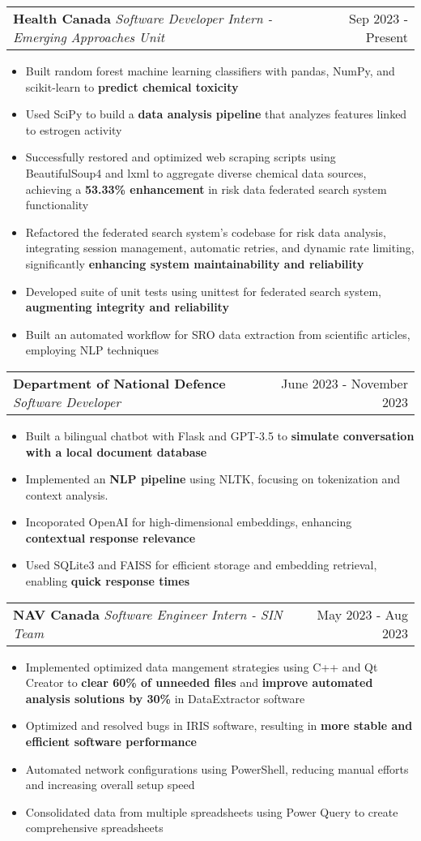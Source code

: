 \documentclass[letterpaper,11pt]{article}
\makeatletter
\newcommand{\resumeItem}[1]{
  \item\small{
    {#1 \vspace{-2pt}}
  }
}
\newcommand{\resumeSubheading}[3]{
    \item
    \begin{tabular*}{0.97\textwidth}[t]{l@{\extracolsep{\fill}}r}
      \textbf{#1} \textbar \textit{ #2} & #3 \\
    \end{tabular*}\vspace{-4.5pt}
}
\newcommand{\resumeItemListStart}{\begin{itemize}}
\newcommand{\resumeItemListEnd}{\end{itemize}\vspace{-5pt}}
\makeatother
\begin{document}
    \resumeSubheading
      {Health Canada}{Software Developer Intern - Emerging Approaches Unit}{Sep 2023 - Present}
      \resumeItemListStart
        \resumeItem{Built random forest machine learning classifiers with pandas, NumPy, and scikit-learn to \textbf{predict chemical toxicity}}
        \resumeItem{Used SciPy to build a \textbf{data analysis pipeline} that analyzes features linked to estrogen activity}
        \resumeItem{Successfully restored and optimized web scraping scripts using BeautifulSoup4 and lxml to aggregate diverse chemical data sources, achieving a \textbf{53.33\% enhancement} in risk data federated search system functionality}
        \resumeItem{Refactored the federated search system's codebase for risk data analysis, integrating session management, automatic retries, and dynamic rate limiting, significantly \textbf{enhancing system maintainability and reliability}}
        \resumeItem{Developed suite of unit tests using unittest for federated search system, \textbf{augmenting integrity and reliability}}
        \resumeItem{Built an automated workflow for SRO data extraction from scientific articles, employing NLP techniques}
      \resumeItemListEnd

    \resumeSubheading
    {Department of National Defence}{Software Developer}{June 2023 - November 2023}
      \resumeItemListStart
        \resumeItem{Built a bilingual chatbot with Flask and GPT-3.5 to \textbf{simulate conversation with a local document database}}
        \resumeItem{Implemented an \textbf{NLP pipeline} using NLTK, focusing on tokenization and context analysis.}
        \resumeItem{Incoporated OpenAI for high-dimensional embeddings, enhancing \textbf{contextual response relevance}}
        \resumeItem{Used SQLite3 and FAISS for efficient storage and embedding retrieval, enabling \textbf{quick response times}}
      \resumeItemListEnd

    \resumeSubheading
    {NAV Canada}{Software Engineer Intern - SIN Team}{May 2023 - Aug 2023}
      \resumeItemListStart
        \resumeItem{Implemented optimized data mangement strategies using C++ and Qt Creator to \textbf{clear 60\% of unneeded files} and \textbf{improve automated analysis solutions by 30\%} in DataExtractor software}
        \resumeItem{Optimized and resolved bugs in IRIS software, resulting in \textbf{more stable and efficient software performance}}
        \resumeItem{Automated network configurations using PowerShell, reducing manual efforts and increasing overall setup speed}
        \resumeItem{Consolidated data from multiple spreadsheets using Power Query to create comprehensive spreadsheets}
      \resumeItemListEnd
\end{document}
